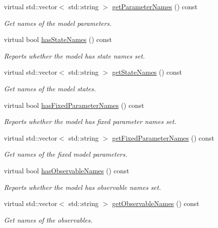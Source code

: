 \begin{DoxyCompactItemize}
virtual std\+::vector$<$ std\+::string $>$ \mbox{\hyperlink{classamici_1_1_model_a7bc0cf1cdd032486ba923fc1d9678262}{get\+Parameter\+Names}} () const
\begin{DoxyCompactList}\small\item\em Get names of the model parameters. \end{DoxyCompactList}\item 
virtual bool \mbox{\hyperlink{classamici_1_1_model_a219d9d04b7eeed20cf4ba36536cd0a4c}{has\+State\+Names}} () const
\begin{DoxyCompactList}\small\item\em Reports whether the model has state names set. \end{DoxyCompactList}\item 
virtual std\+::vector$<$ std\+::string $>$ \mbox{\hyperlink{classamici_1_1_model_a1c55f5cf94db51bb2bbb26d4c425eb0a}{get\+State\+Names}} () const
\begin{DoxyCompactList}\small\item\em Get names of the model states. \end{DoxyCompactList}\item 
virtual bool \mbox{\hyperlink{classamici_1_1_model_a964e924a1fe271f88bac4cfa909e2879}{has\+Fixed\+Parameter\+Names}} () const
\begin{DoxyCompactList}\small\item\em Reports whether the model has fixed parameter names set. \end{DoxyCompactList}\item 
virtual std\+::vector$<$ std\+::string $>$ \mbox{\hyperlink{classamici_1_1_model_a40260fd33966dc70d0edfa21bf655012}{get\+Fixed\+Parameter\+Names}} () const
\begin{DoxyCompactList}\small\item\em Get names of the fixed model parameters. \end{DoxyCompactList}\item 
virtual bool \mbox{\hyperlink{classamici_1_1_model_aa7b808394713a29e59c434dd7f6a23ac}{has\+Observable\+Names}} () const
\begin{DoxyCompactList}\small\item\em Reports whether the model has observable names set. \end{DoxyCompactList}\item 
virtual std\+::vector$<$ std\+::string $>$ \mbox{\hyperlink{classamici_1_1_model_a32b4a0c822a696e388aaa8284bf08059}{get\+Observable\+Names}} () const
\begin{DoxyCompactList}\small\item\em Get names of the observables. \end{DoxyCompactList}\item 

\end{DoxyCompactItemize}
